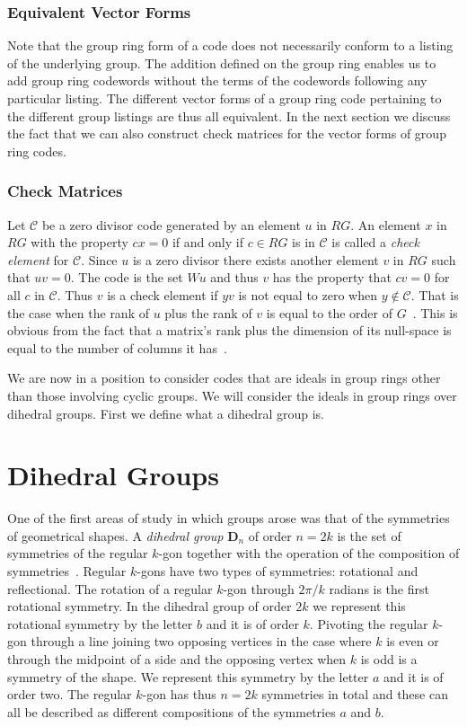 \subsubsection{Equivalent Vector Forms}
\label{sect:equivforms}
Note that the group ring form of a code does not necessarily conform to a listing of the underlying group.
The addition defined on the group ring enables us to add group ring codewords without the terms of the codewords following any particular listing.
The different vector forms of a group ring code pertaining to the different group listings are thus all equivalent.
In the next section we discuss the fact that we can also construct check matrices for the vector forms of group ring codes.

\subsubsection{Check Matrices}
Let $\mathcal{C}$ be a zero divisor code generated by an element $u$ in $RG$.
An element $x$ in $RG$ with the property $cx = 0$ if and only if $c \in RG$ is in $\mathcal{C}$ is called a \emph{check element} for $\mathcal{C}$.
Since $u$ is a zero divisor there exists another element $v$ in $RG$ such that $uv = 0$.
The code is the set $Wu$ and thus $v$ has the property that $cv = 0$ for all $c$ in $\mathcal{C}$.
Thus $v$ is a check element if $yv$ is not equal to zero when $y \notin \mathcal{C}$.
That is the case when the rank of $u$ plus the rank of $v$ is equal to the order of $G$~\cite{hur07,hur09}.
This is obvious from the fact that a matrix's rank plus the dimension of its null-space is equal to the number of columns it has~\cite[p.~245]{mac99}.

We are now in a position to consider codes that are ideals in group rings other than those involving cyclic groups.
We will consider the ideals in group rings over dihedral groups.
First we define what a dihedral group is.

\section{Dihedral Groups}
One of the first areas of study in which groups arose was that of the symmetries of geometrical shapes.
A \emph{dihedral group} $\mathbf{D}_{n}$ of order $n=2k$ is the set of symmetries of the regular $k$-gon together with the operation of the composition of symmetries~\cite[p.~60]{mac99}.
Regular $k$-gons have two types of symmetries: rotational and reflectional.
The rotation of a regular $k$-gon through $2 \pi / k$ radians is the first rotational symmetry.
In the dihedral group of order $2k$ we represent this rotational symmetry by the letter $b$ and it is of order $k$.
Pivoting the regular $k$-gon through a line joining two opposing vertices in the case where $k$ is even or through the midpoint of a side and the opposing vertex when $k$ is odd is a symmetry of the shape.
We represent this symmetry by the letter $a$ and it is of order two.
The regular $k$-gon has thus $n=2k$ symmetries in total and these can all be described as different compositions of the symmetries $a$ and $b$.

